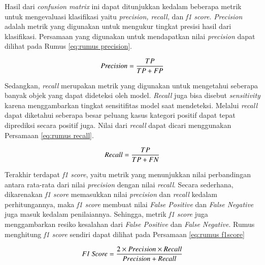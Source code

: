 Hasil dari \emph{confusion matrix} ini dapat ditunjukkan  kedalam beberapa metrik untuk mengevaluasi klasifikasi yaitu \emph{precision, recall,} dan \emph{f1 score}. \emph{Precision} adalah metrik yang digunakan untuk mengukur tingkat presisi hasil dari klasifikasi. Persamaan yang digunakan untuk mendapatkan nilai \emph{precision} dapat dilihat pada Rumus \ref{eq:rumus precision}.

\begin{equation}
  \label{eq:rumus precision}
  \emph{Precision} = \frac{TP}{TP+FP}
\end{equation}

Sedangkan, \emph{recall} merupakan metrik yang digunakan untuk mengetahui seberapa banyak objek yang dapat dideteksi oleh model. \emph{Recall} juga bisa disebut \emph{sensitivity} karena menggambarkan tingkat sensitifitas model saat mendeteksi. Melalui \emph{recall} dapat diketahui seberapa besar peluang kasus kategori positif dapat tepat diprediksi secara positif juga. Nilai dari \emph{recall} dapat dicari menggunakan Persamaan \ref{eq:rumus recall}.

\begin{equation}
  \label{eq:rumus recall}
  \emph{Recall} = \frac{TP}{TP+FN}
\end{equation}

Terakhir terdapat \emph{f1 score}, yaitu metrik yang menunjukkan nilai perbandingan antara rata-rata dari nilai \emph{precision} dengan nilai \emph{recall}. Secara sederhana, dikarenakan \emph{f1 score} memasukkan nilai \emph{precision} dan \emph{recall} kedalam perhitungannya, maka \emph{f1 score} membuat nilai \emph{False Positive} dan \emph{False Negative} juga masuk kedalam penilaiannya. Sehingga, metrik \emph{f1 score} juga menggambarkan resiko kesalahan dari \emph{False Positive} dan \emph{False Negative}. Rumus menghitung \emph{f1 score} sendiri dapat dilihat pada Persamaan \ref{eq:rumus f1score}


\begin{equation}
  \label{eq:rumus f1score}
  \emph{F1 Score} = \frac{2 \times Precision \times Recall}{Precision + Recall}
\end{equation}

